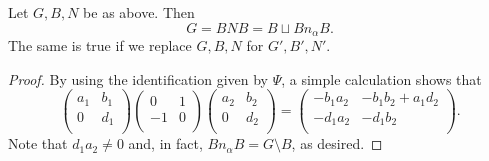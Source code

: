 \begin{theorem} \label{thm:bruhatsl2}
    Let $G,B,N$ be as above. Then 
    $$G=BNB=B\sqcup Bn_\alpha B.$$
    The same is true if we replace $G,B,N$ for $G',B',N'$.
\end{theorem}
\begin{proof}
    By using the identification given by $\Psi$, a simple calculation shows that 
    $$\begin{pmatrix}
        a_1 & b_1\\
        0 & d_1\\
    \end{pmatrix}\begin{pmatrix}
        0 & 1\\
        -1 & 0\\
    \end{pmatrix}\begin{pmatrix}
        a_2 & b_2\\
        0 & d_2\\
    \end{pmatrix}=\begin{pmatrix}
        -b_1a_2 & -b_1b_2+a_1d_2\\
        -d_1a_2 & -d_1b_2\\
    \end{pmatrix}.$$
    Note that $d_1a_2\neq 0$ and, in fact, $Bn_\alpha B=G\setminus B$, as desired.
\end{proof}



